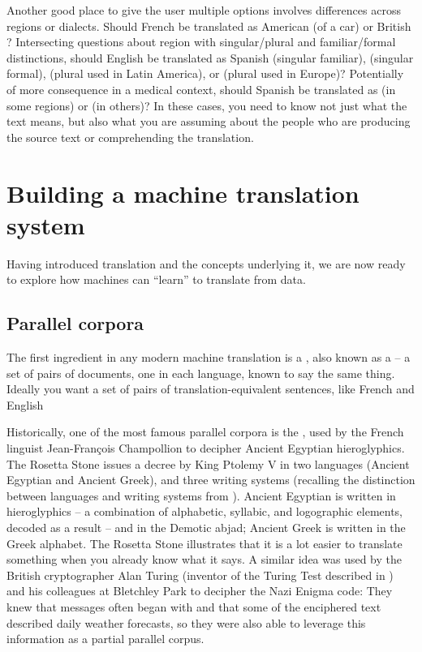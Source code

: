 Another good place to give the user multiple options involves differences across regions or dialects.  Should French  be translated as American  (of a car) or British ?  Intersecting  questions about region with singular/plural and familiar/formal distinctions, should English  be translated as Spanish  (singular familiar),  (singular formal),  (plural used in Latin America), or  (plural used in Europe)? Potentially of more consequence in a medical context,  should Spanish  be translated as  (in some regions) or  (in others)?
 In these cases, you need to know not just what the text means, but also what you are assuming about the people who are producing the source text or comprehending the translation.


% 




\section{Building a machine translation system}

Having introduced translation and the concepts underlying it, we are now ready to explore how machines can ``learn'' to translate from data.

\subsection{Parallel corpora}

The first ingredient in any modern machine translation is a , also known as a  -- a set of pairs of documents, one in each language, known to say the same thing.  Ideally you want a set of pairs of translation-equivalent sentences, like French  and English    

Historically, one of the most famous parallel corpora is the , used by the French linguist Jean-Fran\c{c}ois Champollion to decipher Ancient Egyptian hieroglyphics.  The Rosetta Stone issues a decree by King Ptolemy V in two languages (Ancient Egyptian and Ancient Greek), and three writing systems (recalling the distinction between languages and writing systems from ).  Ancient Egyptian is written in hieroglyphics -- a combination of alphabetic, syllabic, and logographic elements, decoded as a result -- and in the Demotic abjad; Ancient Greek is written in the Greek alphabet.  The Rosetta Stone illustrates that it is a lot easier to translate something when you already know what it says.  A similar idea was used by the British cryptographer Alan Turing (inventor of the Turing Test described in ) and his colleagues at Bletchley Park to decipher the Nazi Enigma code: They knew that messages often began with  and that some of the enciphered text described daily weather forecasts, so they were also able to leverage this information as a partial parallel corpus.

